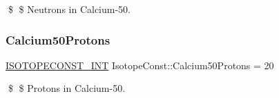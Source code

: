 \$ \$ Neutrons in Calcium-\/50. \mbox{\label{group___isotope_const-_calcium-_ca50_ga1a1de08e3b31d50d57827aec17f84630}} 
\subsubsection{\texorpdfstring{Calcium50\+Protons}{Calcium50Protons}}
{\footnotesize\ttfamily \mbox{\hyperlink{group___isotope_const-_macros_ga5f18360b3e99483a35c32d789e62621c}{I\+S\+O\+T\+O\+P\+E\+C\+O\+N\+S\+T\+\_\+\+I\+NT}} Isotope\+Const\+::\+Calcium50\+Protons = 20}

\$ \$ Protons in Calcium-\/50. 